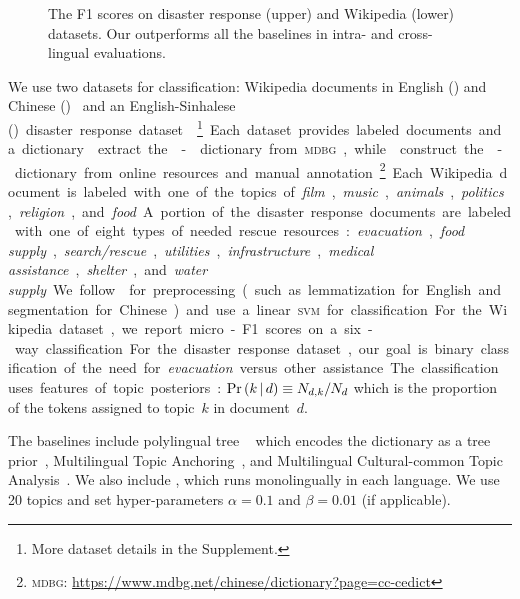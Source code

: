 \begin{figure}[t]
  \caption{The F1 scores on disaster response (upper) and Wikipedia (lower) datasets. Our \mtm outperforms all the baselines in intra- and cross-lingual evaluations.}\label{fig:f1}
\end{figure}


We use two datasets for classification: Wikipedia documents in English (\en)
 and Chinese (\zh)~\cite{yuan-2018-mtanchor} and an
English-Sinhalese (\si) disaster response
dataset~\cite{strassel-2016-lorelei}.\footnote{More dataset details in
  the Supplement.}
%
Each dataset provides labeled documents and a
dictionary.  extract the \en-\zh
dictionary from \textsc{mdbg}, while~
construct the \en-\si dictionary from online resources and manual
annotation.\footnote{\textsc{mdbg}:
  \url{https://www.mdbg.net/chinese/dictionary?page=cc-cedict}}
%
Each Wikipedia document is labeled with one of the topics of
\emph{film}, \emph{music}, \emph{animals}, \emph{politics},
\emph{religion}, and \emph{food}. A portion of the disaster response
documents are labeled with one of eight types of needed rescue
resources: \emph{evacuation}, \emph{food supply},
\emph{search/rescue}, \emph{utilities}, \emph{infrastructure},
\emph{medical assistance}, \emph{shelter}, and \emph{water supply}.

We follow~ for preprocessing (such as lemmatization for English and segmentation for Chinese) and use a linear \textsc{svm}
for classification.
%
For the Wikipedia dataset, we
report micro-F1 scores on a six-way classification.
 For the disaster response dataset, our goal is binary classification of
the need for \emph{evacuation} versus other assistance.
The classification uses features of topic posteriors: $\Pr \left( k \,|\, d \right) \equiv N_{d,k} / N_{d}$ which is the proportion of the tokens assigned to topic~$k$ in document~$d$.

The baselines include polylingual tree
\lda~\cite[\ptlda]{Hu-2014-ptlda} which encodes the dictionary as a
tree prior~\cite{andrzejewski-2009-dir-forest}, Multilingual Topic
Anchoring~\cite[\mtanchor]{yuan-2018-mtanchor}, and Multilingual
Cultural-common Topic Analysis~\cite[\mcta]{shi-2016-mtm-common}. We
also include \lda, which runs monolingually in each language. We use
20 topics and set hyper-parameters $\alpha=0.1$ and $\beta=0.01$
(if applicable).

